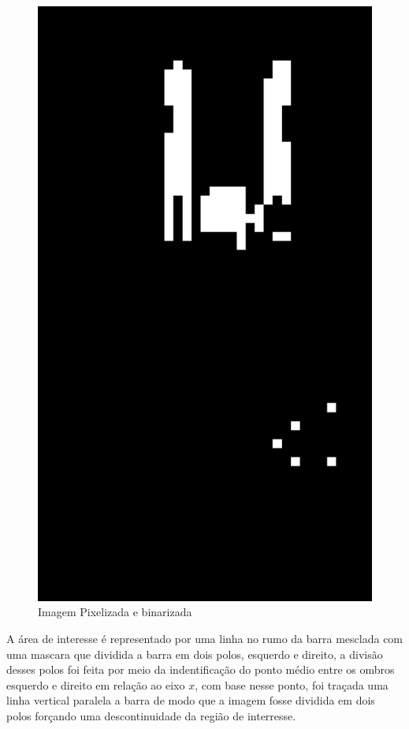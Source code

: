 \begin{figure}[!htbp]
\begin{minipage}{\sizeImg\textwidth}
            \includegraphics[width=\textwidth]{figuras/mao_barra/limited3.png}
        \end{minipage}
    \caption{Imagem Pixelizada e binarizada}
    \label{fig:pixeled}
\end{figure}
\newpage

A área de interesse é representado por uma linha no rumo da barra mesclada com uma mascara que dividida a barra em dois polos, esquerdo e direito, a divisão desses polos foi feita por meio da indentificação do ponto médio entre os ombros esquerdo e direito em relação ao eixo $x$, com base nesse ponto, foi traçada uma linha vertical paralela a barra de modo que a imagem fosse dividida em dois polos forçando uma descontinuidade da região de interresse.


